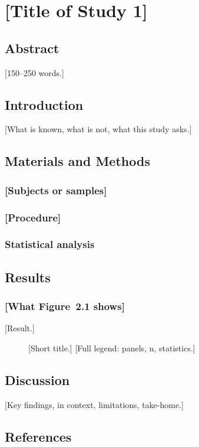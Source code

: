 \chapter{[Title of Study 1]}
\label{ch:study1}

\section{Abstract}
\label{sec:abstract_2}
[150–250 words.]

\section{Introduction}
\label{sec:intro_2}
[What is known, what is not, what this study asks.]

\section{Materials and Methods}
\label{sec:methods_2}
\subsection{[Subjects or samples]}
\subsection{[Procedure]}
\subsection{Statistical analysis}

\section{Results}
\label{sec:results_2}
\subsection{[What Figure~2.1 shows]}
[Result.]

\begin{figure}[tbp]
  \centering
  \caption{[Short title.] [Full legend: panels, n, statistics.]}
  \label{fig:study1-fig1}
\end{figure}

\section{Discussion}
\label{sec:discussion_2}
[Key findings, in context, limitations, take-home.]

\section{References}
\label{sec:ref_2}
